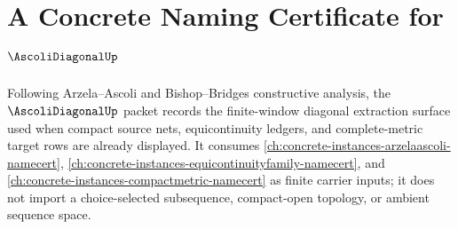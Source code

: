 \chapter{A Concrete Naming Certificate for $\AscoliDiagonalUp$}
\label{ch:concrete-instances-ascoli-diagonal-namecert}

Following Arzela--Ascoli and Bishop--Bridges constructive analysis, the
$\AscoliDiagonalUp$ packet records the finite-window diagonal extraction
surface used when compact source nets, equicontinuity ledgers, and
complete-metric target rows are already displayed. It consumes
\autoref{ch:concrete-instances-arzelaascoli-namecert},
\autoref{ch:concrete-instances-equicontinuityfamily-namecert}, and
\autoref{ch:concrete-instances-compactmetric-namecert} as finite carrier
inputs; it does not import a choice-selected subsequence, compact-open
topology, or ambient sequence space.

